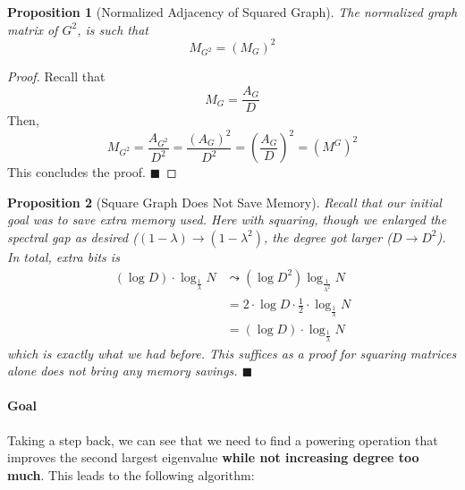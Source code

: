 \documentclass[11pt, letter]{book}
\newcommand{\qed}{\hfill $\blacksquare$}
\newtheorem{proposition}{Proposition}[chapter]
\begin{document}
\begin{proposition}[Normalized Adjacency of Squared Graph]
	The normalized graph matrix of $G^2$, is such that
	\begin{equation}
		M_{G^2} = \left ( M_G \right ) ^2
	\end{equation}
\end{proposition}

\begin{proof}
	Recall that 
	\begin{equation}
		M_G = \frac{A_G}{D}
	\end{equation}
	Then, 
	\begin{equation}
		M_{G^2} = \frac{A_{G^2}}{D^2} = \frac{(A_G)^2}{D^2} = \left( \frac{A_G}{D} \right) ^2 = (M^G) ^2
	\end{equation}
	This concludes the proof. \qed
\end{proof}

\begin{proposition}[Square Graph Does Not Save Memory]
	Recall that our initial goal was to save extra memory used. Here with squaring, though we enlarged the spectral gap as desired ($(1 - \lambda) \rightarrow (1 - \lambda^2) $, the degree got larger ($D \rightarrow D^2$). In total, extra bits is
	\begin{align}
		\left ( \log D \right ) \cdot \log_{\frac{1}{\lambda}} N
		&\leadsto \left( \log D^2 \right) \log _{\frac{1}{\lambda^2}} N \\
		&= 2 \cdot \log D \cdot \frac{1}{2} \cdot \log _{\frac{1}{\lambda}} N \\
		&= \left ( \log D \right ) \cdot \log_{\frac{1}{\lambda}} N
	\end{align}
	which is exactly what we had before. This suffices as a proof for squaring matrices alone does not bring any memory savings. \qed
\end{proposition}

\paragraph{Goal} Taking a step back, we can see that we need to find a powering operation that improves the second largest eigenvalue \textbf{while not increasing degree too much}. This leads to the following algorithm:
\end{document}
